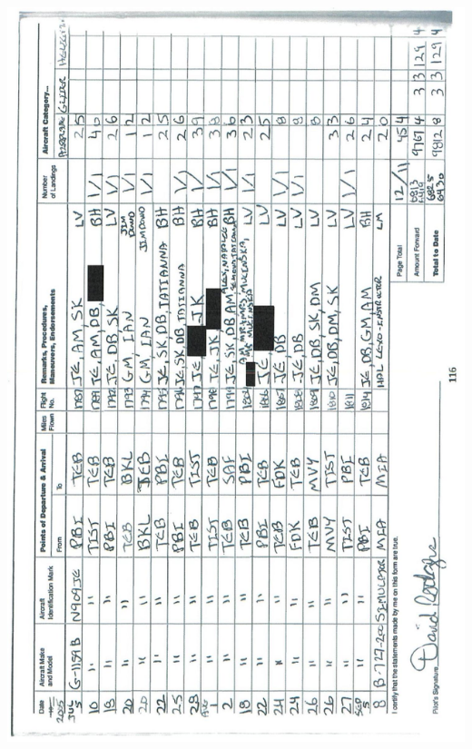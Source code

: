 \documentclass[10pt]{article}
\begin{document}
\includegraphics[max width=\textwidth, center]{2025_02_27_dd68c3d38de88f0516d9g-120}\\
\end{document}
